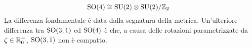 \begin{equation}
	\mathrm{SO}(4) \cong \mathrm{SU}(2) \otimes \mathrm{SU}(2) / \mathbb{Z}_2
	\label{eq:10.29}
\end{equation}
La differenza fondamentale è data dalla segnatura della metrica. Un'ulteriore differenza tra $ \mathrm{SO}(3,1) $ ed $ \mathrm{SO}(4) $ è che, a causa delle rotazioni parametrizzate da $ \zeta \in \mathbb{R}^+_0 $, $ \mathrm{SO}(3,1) $ non è compatto.












